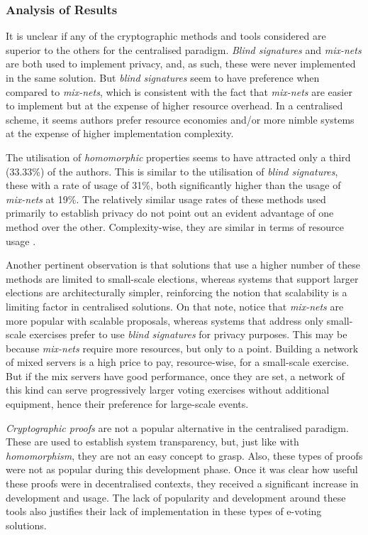 \documentclass[../access.tex]{subfiles}
\begin{document}
    \subsubsection{Analysis of Results}
    It is unclear if any of the cryptographic methods and tools considered are superior to the others for the centralised paradigm. \textit{Blind signatures} and \textit{mix-nets} are both used to implement privacy, and, as such, these were never implemented in the same solution. But \textit{blind signatures} seem to have preference when compared to \textit{mix-nets}, which is consistent with the fact that \textit{mix-nets} are easier to implement but at the expense of higher resource overhead. In a centralised scheme, it seems authors prefer resource economies and/or more nimble systems at the expense of higher implementation complexity.
    \par
    The utilisation of \textit{homomorphic} properties seems to have attracted only a third (33.33\%) of the authors. This is similar to the utilisation of \textit{blind signatures}, these with a rate of usage of 31\%, both significantly higher than the usage of \textit{mix-nets} at 19\%. The relatively similar usage rates of these methods used primarily to establish privacy do not point out an evident advantage of one method over the other. Complexity-wise, they are similar in terms of resource usage \cite{Hebant2020} \cite{Sidorov2022}.
    \par
    Another pertinent observation is that solutions that use a higher number of these methods are limited to small-scale elections, whereas systems that support larger elections are architecturally simpler, reinforcing the notion that scalability is a limiting factor in centralised solutions. On that note, notice that \textit{mix-nets} are more popular with scalable proposals, whereas systems that address only small-scale exercises prefer to use \textit{blind signatures} for privacy purposes. This may be because \textit{mix-nets} require more resources, but only to a point. Building a network of mixed servers is a high price to pay, resource-wise, for a small-scale exercise. But if the mix servers have good performance, once they are set, a network of this kind can serve progressively larger voting exercises without additional equipment, hence their preference for large-scale events.
    \par
    \textit{Cryptographic proofs} are not a popular alternative in the centralised paradigm. These are used to establish system transparency, but, just like with \textit{homomorphism}, they are not an easy concept to grasp. Also, these types of proofs were not as popular during this development phase. Once it was clear how useful these proofs were in decentralised contexts, they received a significant increase in development and usage. The lack of popularity and development around these tools also justifies their lack of implementation in these types of e-voting solutions.
\end{document}
